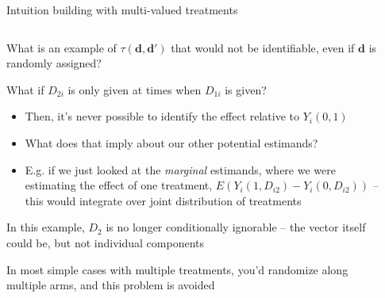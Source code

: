 \documentclass[notes,11pt, aspectratio=169]{beamer}
\newenvironment{wideitemize}{\itemize\addtolength{\itemsep}{10pt}}{\enditemize}
\begin{document}
\begin{frame}{Intuition building with multi-valued treatments}
\begin{columns}[T] %
  \begin{column}{.7\textwidth}
    \begin{wideitemize}
    \item What is an example of $\tau(\mathbf{d}, \mathbf{d}')$ that
      would not be identifiable, even if $\mathbf{d}$ is randomly
      assigned?
      \pause
    \item What if $D_{2i}$ is only given at times when $D_{1i}$ is given?
      \begin{itemize}
      \item Then, it's never possible to identify the effect relative
        to $Y_{i}(0,1)$
      \item What does that imply about our other potential estimands?
      \item E.g. if we just looked at the \emph{marginal} estimands,
        where we were estimating the effect of one treatment,
        $E(Y_{i}(1, D_{i2}) - Y_{i}(0, D_{i2}))$ -- this would
        integrate over joint distribution of treatments
      \end{itemize}
    \item In this example, $D_{2}$ is no longer conditionally
      ignorable -- the vector itself could be, but not individual components
    \item In most simple cases with multiple treatments, you'd
      randomize along multiple arms, and this problem is avoided
    \end{wideitemize}    

\end{column}%
  \hfill%
  \begin{column}{.3\textwidth}
    \begin{center}
    \end{center}
  \end{column}
\end{columns}
\end{frame}
\end{document}
